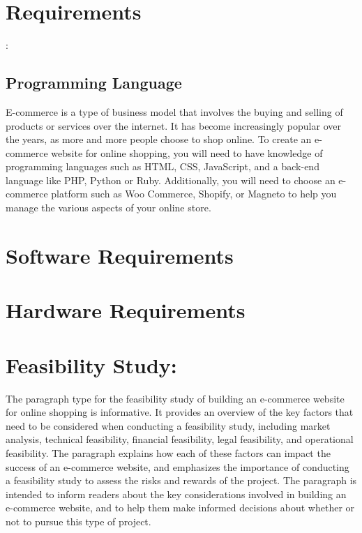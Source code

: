 \documentclass{article}
\begin{document}
\section{Requirements}:
\subsection{Programming Language}
E-commerce is a type of business model that involves the buying and selling of products or services over the internet. It has become increasingly popular over the years, as more and more people choose to shop online. To create an e-commerce website for online shopping, you will need to have knowledge of programming languages such as HTML, CSS, JavaScript, and a back-end language like PHP, Python or Ruby. Additionally, you will need to choose an e-commerce platform such as Woo Commerce, Shopify, or Magneto to help you manage the various aspects of your online store.
\section{Software Requirements}

\section{Hardware Requirements}

\section{Feasibility Study:}
The paragraph type for the feasibility study of building an e-commerce website for online shopping is informative. It provides an overview of the key factors that need to be considered when conducting a feasibility study, including market analysis, technical feasibility, financial feasibility, legal feasibility, and operational feasibility. The paragraph explains how each of these factors can impact the success of an e-commerce website, and emphasizes the importance of conducting a feasibility study to assess the risks and rewards of the project. The paragraph is intended to inform readers about the key considerations involved in building an e-commerce website, and to help them make informed decisions about whether or not to pursue this type of project.
\end{document}
